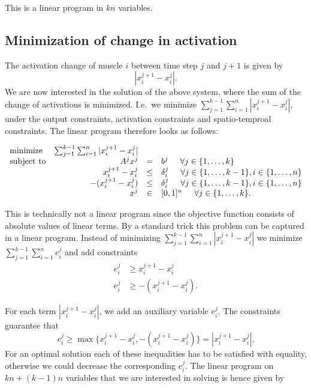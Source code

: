 This is a linear program in $kn$ variables.




\subsection{Minimization of change in activation} %
\label{sub:minimization_of_change_in_activation}
The activation change of muscle $i$ between time step $j$ and $j+1$ is given by
\[|x_i^{j+1} - x_i^{j}|.\]
We are now interested in the solution of the above system, where the sum of the change of activations is minimized. I.e.\ we minimize $\sum_{j=1}^{k-1}\sum_{i=1}^n |x_i^{j+1} - x_i^{j}|$, under the output constraints, activation constraints and spatio-temproal constraints. The linear program therefore looks as follows:

\begin{equation}
\begin{array}{lrcl}
\mbox{minimize} & \sum_{j=1}^{k-1} \sum_{i=1}^n |x_i^{j+1} - x_i^{j}| \\ 
\mbox{subject to} & A^j x^j &=& b^j \hspace{5mm} \forall j \in \{1,\dots, k\} \\
  & x_i^{j+1} - x_i^{j} &\leq& \delta_i^j  \hspace{5mm} \forall j \in \{1,\dots, k-1\}, i \in \{1,\dots,n\} \\
  &  -(x_i^{j+1} - x_i^{j}) &\leq& \delta_i^j  \hspace{5mm} \forall j \in \{1,\dots, k-1\}, i \in \{1,\dots,n\} \\
  & x^j &\in& [0,1]^n \hspace{5mm} \forall j \in \{1,\dots, k\}.
\end{array}
\end{equation}

This is technically not a linear program since the objective function consists of absolute values of linear terms. By a standard trick this problem can be captured in a linear program. Instead of minimizing $\sum_{j=1}^{k-1} \sum_{i=1}^n |x_i^{j+1} - x_i^{j}|$ we minimize $\sum_{j=1}^{k-1} \sum_{i=1}^n e_i^j$ and add constraints 
\begin{align*}
e_i^j &\geq x_i^{j+1} - x_i^{j} \\
e_i^j &\geq - (x_i^{j+1} - x_i^{j}).
\end{align*}

For each term $|x_i^{j+1} - x_i^{j}|$, we add an auxiliary variable $e_i^j$. The constraints guarantee that 
\[e_i^j \geq \max\{x_i^{j+1} - x_i^{j}, - (x_i^{j+1} - x_i^{j})\} = |x_i^{j+1} - x_i^{j}|.\]
For an optimal solution each of these inequalities has to be satisfied with equality, otherwise we could decrease the corresponding $e_i^j$. The linear program on $kn + (k-1)n$ variables that we are interested in solving is hence given by

